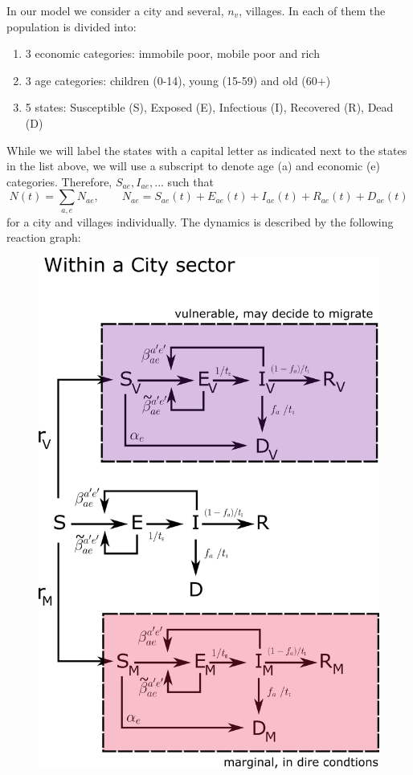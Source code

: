 \documentclass{article}
\begin{document}
In our model we consider a city and several, $n_v$, villages. 
In each of them the population is divided into:
\begin{enumerate}
	\item 3 economic categories: immobile poor, mobile poor and rich
	\item 3 age categories: children (0-14), young (15-59) and old (60+) 
	\item 5 states:  Susceptible (S), Exposed (E), Infectious (I), Recovered (R), Dead (D)
\end{enumerate}

While we will label the states with a capital letter as indicated next to the states in the list above, we will use a subscript to denote age (a) and economic (e) categories. Therefore, $S_{ae}, I_{ae},...$ such that \[ N(t) = \sum_{a,e} N_{ae}, \qquad N_{ae} = S_{ae}(t) + E_{ae}(t) + I_{ae}(t) + R_{ae}(t) +D_{ae}(t) \] for a city and villages individually. The dynamics is described by the following reaction graph:

\begin{figure}[H]
	\centering
	\includegraphics[width=\textwidth]{scheme2}
\end{figure}
\end{document}
